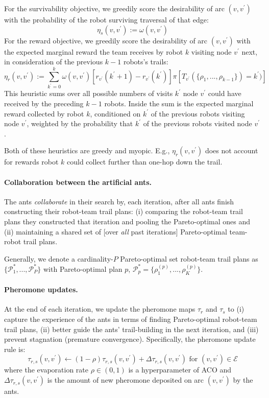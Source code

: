 \documentclass[11pt, oneside]{article}
\begin{document}
For the survivability objective, we greedily score the desirability of arc $(v, v^\prime)$ with the probability of the robot surviving traversal of that edge:
\begin{equation}
	\eta_s(v, v^\prime):=\omega(v, v^\prime) 
\end{equation}
For the reward objective, we greedily score the desirability of arc $(v, v^\prime)$ with the expected marginal reward the team receives by robot $k$ visiting node $v^\prime$ next, in consideration of the previous $k-1$ robots's trails:
\begin{equation}
	\eta_r(v, v^\prime) :=  \sum_{k^\prime=0}^k \omega(v, v^\prime)  [r_{v^\prime}(k^\prime+1) - r_{v^\prime}(k^\prime)]
	 \pi[ T_{v^\prime}(\{\rho_1, ..., \rho_{k-1}\}) = k^\prime )]
\end{equation}
This heuristic sums over all possible numbers of visits $k^\prime$ node $v^\prime$ could have received by the preceding $k-1$ robots. Inside the sum is the expected marginal reward collected by robot $k$, conditioned on $k^\prime$ of the previous robots visiting node $v^\prime$, weighted by the probability that $k^\prime$ of the previous robots visited node $v^\prime$.

Both of these heuristics are greedy and myopic. E.g., $\eta_r(v, v^\prime)$ does not account for rewards robot $k$ could collect further than one-hop down the trail. 

\paragraph{Collaboration between the artificial ants.}
The ants \emph{collaborate} in their search by, each iteration, after all ants finish constructing their robot-team trail plans:
(i) comparing the robot-team trail plans they constructed that iteration and pooling the Pareto-optimal ones and
(ii) maintaining a shared set of [over \emph{all} past iterations] Pareto-optimal team-robot trail plans.

Generally, we denote a cardinality-$P$ Pareto-optimal set robot-team trail plans as $\{\mathcal{P}_1^*, ..., \mathcal{P}_P^*\}$ with Pareto-optimal plan $p$, $\mathcal{P}^*_p=\{\rho_1^{(p)}, ..., \rho_K^{(p)}\}$.


\paragraph{Pheromone updates.} At the end of each iteration, we update the pheromone maps $\tau_r$ and $\tau_s$ to (i) capture the experience of the ants in terms of finding Pareto-optimal robot-team trail plans, (ii) better guide the ants' trail-building in the next iteration, and (iii) prevent stagnation (premature convergence). Specifically, the pheromone update rule is:
\begin{equation}
	\tau_{r, s}(v, v^\prime) \leftarrow (1-\rho) \tau_{r,s}(v, v^\prime)  + \Delta \tau_{r,s}(v, v^\prime) \text{ for } (v, v^\prime) \in \mathcal{E} \label{eq:tau_update}
\end{equation}
where the evaporation rate $\rho \in (0, 1)$ is a hyperparameter of ACO and $\Delta \tau_{r,s}(v, v^\prime)$ is the amount of new pheromone deposited on arc $(v, v^\prime)$ by the ants.
\end{document}
